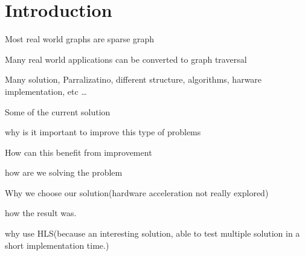\chapter{Introduction} \label{intro}

\begin{list_type}  
\item Most real world graphs are sparse graph
\item Many real world applications can be converted to graph traversal
\item Many solution, Parralizatino, different structure, algorithms, harware implementation, etc \ldots 
\item Some of the current solution
\item why is it important to improve this type of problems
\item How can this benefit from improvement
\item how are we solving the problem
\item Why we choose our solution(hardware acceleration not really explored)
\item how the result was.
\item why use HLS(because an interesting solution, able to test multiple solution in a short implementation time.)
\item 
\end{list_type}

